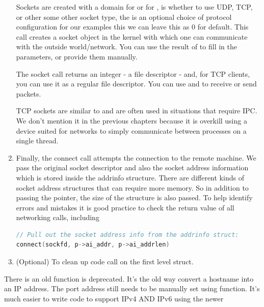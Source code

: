 \begin{enumerate}
Sockets are created with a domain  for  or  for ,  is whether to use UDP, TCP, or other some other socket type, the  is an optional choice of protocol configuration for our examples this we can leave this as 0 for default.
This call creates a socket object in the kernel with which one can communicate with the outside world/network.
You can use the result of  to fill in the  parameters, or provide them manually.

The socket call returns an integer - a file descriptor - and, for TCP clients, you can use it as a regular file descriptor.
You can use  and  to receive or send packets.

TCP sockets are similar to  and are often used in situations that require IPC.
We don't mention it in the previous chapters because it is overkill using a device suited for networks to simply communicate between processes on a single thread.

\item {}

Finally, the connect call attempts the connection to the remote machine.
We pass the original socket descriptor and also the socket address information which is stored inside the addrinfo structure.
There are different kinds of socket address structures that can require more memory.
So in addition to passing the pointer, the size of the structure is also passed.
To help identify errors and mistakes it is good practice to check the return value of all networking calls, including 


\begin{lstlisting}[language=C]
// Pull out the socket address info from the addrinfo struct:
connect(sockfd, p->ai_addr, p->ai_addrlen)
\end{lstlisting}

\item (Optional) To clean up code call  on the first level  struct.
\end{enumerate}

There is an old function  is deprecated.
It's the old way convert a hostname into an IP address.
The port address still needs to be manually set using  function.
It's much easier to write code to support IPv4 AND IPv6 using the newer 

